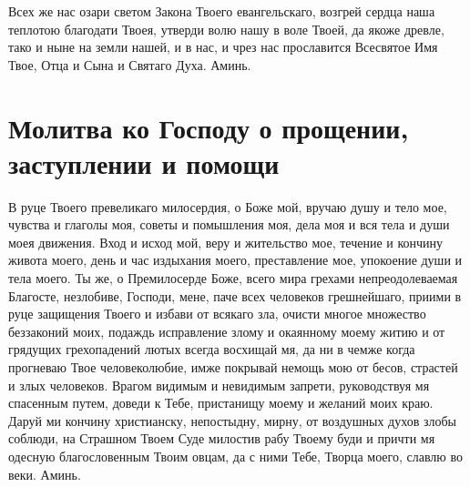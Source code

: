 \begin{mymulticols}
Всех же нас озари светом Закона Твоего евангельскаго, возгрей сердца наша теплотою благодати Твоея, утверди волю нашу в воле Твоей, да якоже древле, тако и ныне на земли нашей, и в нас, и чрез нас прославится Всесвятое Имя Твое, Отца и Сына и Святаго Духа. Аминь. 

\end{mymulticols}

\section{Молитва ко Господу о прощении, заступлении и помощи}\begin{mymulticols}
 

В руце Твоего превеликаго милосердия, о Боже мой, вручаю душу и тело мое, чувства и глаголы моя, советы и помышления моя, дела моя и вся тела и души моея движения. Вход и исход мой, веру и жительство мое, течение и кончину живота моего, день и час издыхания моего, преставление мое, упокоение души и тела моего. Ты же, о Премилосерде Боже, всего мира грехами непреодолеваемая Благосте, незлобиве, Господи, мене, паче всех человеков грешнейшаго, приими в руце защищения Твоего и избави от всякаго зла, очисти многое множество беззаконий моих, подаждь исправление злому и окаянному моему житию и от грядущих грехопадений лютых всегда восхищай мя, да ни в чемже когда прогневаю Твое человеколюбие, имже покрывай немощь мою от бесов, страстей и злых человеков. Врагом видимым и невидимым запрети, руководствуя мя спасенным путем, доведи к Тебе, пристанищу моему и желаний моих краю. Даруй ми кончину христианску, непостыдну, мирну, от воздушных духов злобы соблюди, на Страшном Твоем Суде милостив рабу Твоему буди и причти мя одесную благословенным Твоим овцам, да с ними Тебе, Творца моего, славлю во веки. Аминь.

\end{mymulticols}

